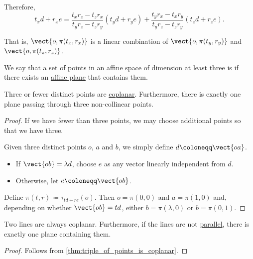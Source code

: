 \begin{defproof}
\begin{itemize}
    Therefore,
    \begin{equation*}
      t_x d + r_x e
      =
      \frac {t_x r_z - t_z r_x} {t_y r_z - t_z r_y} (t_y d + r_y e) + \frac {t_y r_x - t_x r_y} {t_y r_z - t_z r_y} (t_z d + r_z e).
    \end{equation*}

    That is, \( \vect{o,\pi(t_x,r_x)} \) is a linear combination of \( \vect{o,\pi(t_y,r_y)} \) and \( \vect{o,\pi(t_z,r_z)} \).
  \end{itemize}
\end{defproof}

\begin{definition}\label{def:coplanar_points}\mimprovised
  We say that a set of points in an affine space of dimension at least three is  if there exists an \hyperref[def:affine_plane]{affine plane} that contains them.
\end{definition}

\begin{proposition}\label{thm:triple_of_points_is_coplanar}
  Three or fewer distinct points are \hyperref[def:coplanar_points]{coplanar}. Furthermore, there is exactly one plane passing through three non-collinear points.
\end{proposition}
\begin{proof}
  If we have fewer than three points, we may choose additional points so that we have three.

  Given three distinct points \( o \), \( a \) and \( b \), we simply define \( d \coloneqq \vect{oa} \).
  \begin{itemize}
    \item If \( \vect{ob} = \lambda d \), choose \( e \) as any vector linearly independent from \( d \).
    \item Otherwise, let \( e \coloneqq \vect{ob} \).
  \end{itemize}

  Define \( \pi(t, r) \coloneqq \tau_{td + re}(o) \). Then \( o = \pi(0, 0) \) and \( a = \pi(1, 0) \) and, depending on whether \( \vect{ob} = td \), either \( b = \pi(\lambda, 0) \) or \( b = \pi(0, 1) \).
\end{proof}

\begin{proposition}\label{thm:two_lines_are_coplanar}
  Two lines are always coplanar. Furthermore, if the lines are not \hyperref[def:affine_parallelism]{parallel}, there is exactly one plane containing them.
\end{proposition}
\begin{proof}
  Follows from \cref{thm:triple_of_points_is_coplanar}.
\end{proof}

